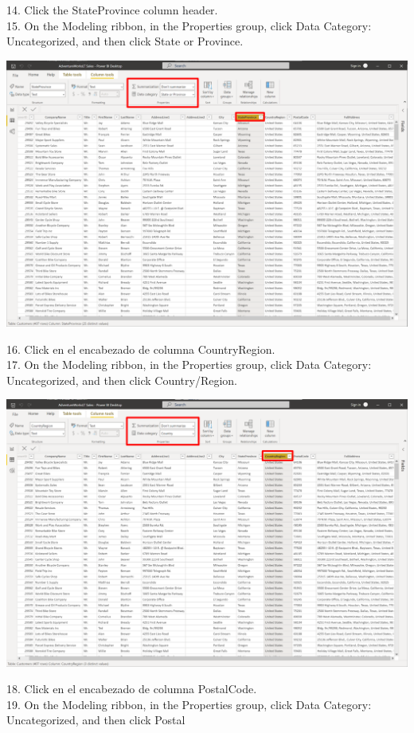 \documentclass[12pt,letterpaper]{article}
\begin{document}
14. Click the StateProvince column header.
\\15. On the Modeling ribbon, in the Properties group, click Data Category: Uncategorized, and then click State or
Province.
\begin{center}
    \includegraphics[width=15cm]{img/117.png}  
\end{center}
16. Click en el encabezado de columna CountryRegion.
\\17. On the Modeling ribbon, in the Properties group, click Data Category: Uncategorized, and then click
Country/Region.
\begin{center}
    \includegraphics[width=15cm]{img/118.png}  
\end{center}
18. Click en el encabezado de columna PostalCode.
\\19. On the Modeling ribbon, in the Properties group, click Data Category: Uncategorized, and then click Postal
\end{document}
